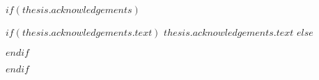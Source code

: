 %
%
 

$if(thesis.acknowledgements)$
\begingroup
\renewcommand{\abovechapterskip}{\vspace*{15pt}}  %
  \renewcommand{\chapterbelowskip}{\vspace*{20pt}}  %
  \renewcommand{\chapteralign}{\centering}      %
  \renewcommand{\chapterfont}{\bfseries\Large}  %

  \begin{acknowledgements}
  
  $if(thesis.acknowledgements.text)$
  $thesis.acknowledgements.text$
  $else$
  
  $endif$

  \end{acknowledgements}
\endgroup
$endif$

%
%
%
%
%
%
%
%
%

%
%


